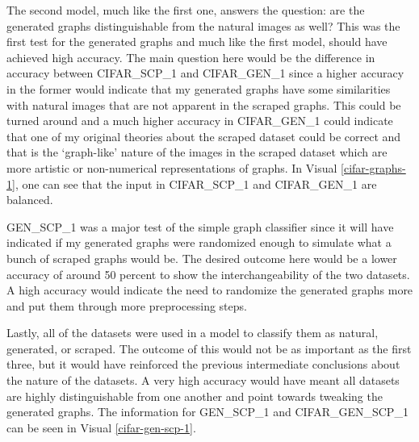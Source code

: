 \documentclass[12pt]{article}
\begin{document}
            The second model, much like the first one, answers the question: 
            are the generated graphs distinguishable from the natural images as well? 
            This was the first test for the generated graphs and much like the first model, 
            should have achieved high accuracy. The main question here would be the difference in accuracy between CIFAR\_SCP\_1 
            and CIFAR\_GEN\_1 since a higher accuracy in the former would indicate 
            that my generated graphs have some similarities with natural images that are not apparent in the scraped graphs. 
            This could be turned around and a much higher accuracy in CIFAR\_GEN\_1 could indicate 
            that one of my original theories about the scraped dataset could be correct 
            and that is the ‘graph-like’ nature of the images in the scraped dataset which are more artistic 
            or non-numerical representations of graphs. 
            In Visual \ref{cifar-graphs-1}, one can see that the input in CIFAR\_SCP\_1 and CIFAR\_GEN\_1 are balanced.
                        
            GEN\_SCP\_1 was a major test of the simple graph classifier 
            since it will have indicated if my generated graphs were randomized enough to simulate what a bunch of scraped graphs would be.
            The desired outcome here would be a lower accuracy of around 50 percent to show the interchangeability of the two datasets. 
            A high accuracy would indicate the need to randomize the generated graphs more and put them through more preprocessing steps.
                        
            Lastly, all of the datasets were used in a model to classify them as natural, generated, or scraped. 
            The outcome of this would not be as important as the first three, 
            but it would have reinforced the previous intermediate conclusions about the nature of the datasets. 
            A very high accuracy would have meant all datasets are highly distinguishable from one another 
            and point towards tweaking the generated graphs. The information for GEN\_SCP\_1 and CIFAR\_GEN\_SCP\_1
            can be seen in Visual \ref{cifar-gen-scp-1}.
            
\end{document}

